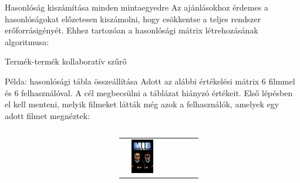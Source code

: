 \documentclass[english, aspectratio=169]{beamer}
\begin{document}
\begin{frame}{Hasonlóság kiszámítása minden mintaegyedre}
Az ajánlásokhoz érdemes a hasonlóságokat előzetesen kiszámolni, hogy csökkentse a teljes rendszer erőforrásigényét. Ehhez tartozóan a hasonlósági mátrix létrehozásának algoritmusa:
\begin{algorithm}[H]
\caption{Termék-termék kollaboratív szűrő}
\SetAlgoLined
\end{algorithm}
\end{frame}

\begin{frame}{Példa: hasonlósági tábla összeállítása}
Adott az alábbi értékelési mátrix 6 filmmel és 6 felhasználóval. A cél megbecsülni a táblázat hiányzó értékeit. Első lépésben el kell menteni, melyik filmeket látták még azok a felhasználók, amelyek egy adott filmet megnéztek:
\begin{columns}
\begin{column}{.3\textwidth}
\begin{footnotesize}
\vspace{.5cm}\\
\end{footnotesize}
\end{column}
\begin{column}{.8\textwidth}
\begin{center}
\begin{footnotesize}
\begin{tabular}{|c|c|c|c|c|c|c|}
\hline
& 
\includegraphics[height=1.5cm, keepaspectratio]{images/movies/men_in_black.png} &

\end{tabular}
\end{footnotesize}
\end{center}
\end{column}
\end{columns}
\end{frame}
\end{document}
